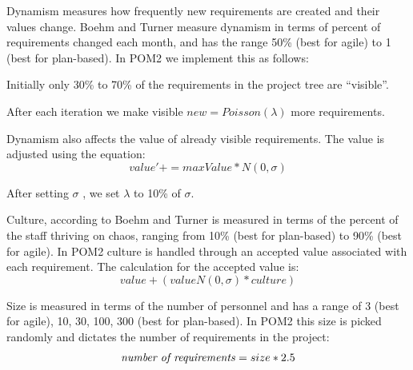 \begin{kasten}
{    \vspace{3 mm}
    Dynamism measures how frequently new requirements are created and their values change.  Boehm and Turner measure dynamism 
    in terms of percent of requirements changed each month, and has the range 50\% (best for agile) to 1 (best for plan-based).
    In POM2 we implement this as follows:
    \begin{smallitem}
    \item Initially only 30\% to 70\% of the requirements in the project tree are ``visible''.
    \item After each iteration we make visible \begin{math} new = Poisson(\lambda) \end{math} more requirements.
    \item Dynamism also affects the value of already visible requirements.  The value is adjusted using the equation:
      \begin{equation} value' += maxValue * N(0,\sigma) \end{equation}
    \item After setting \begin{math}\sigma\end{math} , we set \begin{math}\lambda\end{math} to 10\% of \begin{math}\sigma\end{math}.
    \end{smallitem}

    Culture, according to Boehm and Turner is measured in terms of the percent of the staff thriving on chaos, ranging from
    10\% (best for plan-based) to 90\% (best for agile).  In POM2 culture is handled through an accepted value associated with 
    each requirement.  The calculation for the accepted value is: \begin{equation} value + (value N(0,\sigma)*culture) \end{equation}
    
    \vspace{3 mm}
    Size is measured in terms of the number of personnel and has a range of 3 (best for agile), 10, 30, 100, 300 (best for plan-based).
    In POM2 this size is picked randomly and dictates the number of requirements in the project:
    \begin{equation} \mathtt{\mbox{\textit{number of requirements}}} = size * 2.5 \end{equation}
    
}
\end{kasten}
